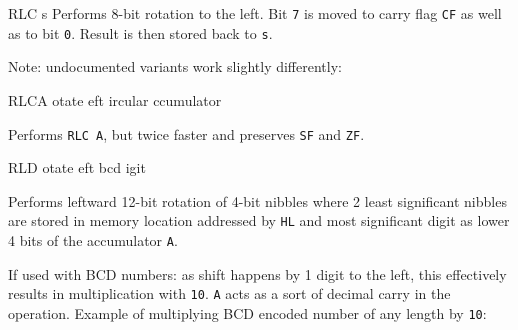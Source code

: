 \documentclass[12pt,twoside,openright,a4paper]{book}
\begin{document}
\begin{basedescript}{
	\desclabelstyle{\multilinelabel}
	\desclabelwidth{3cm}}
\begin{DetailItem}{RLC s}
		Performs 8-bit rotation to the left. Bit {\tt 7} is moved to carry flag {\tt CF} as well as to bit {\tt 0}. Result is then stored back to {\tt s}.

		Note: undocumented variants work slightly differently:

		\begin{multicols}{2}

		\end{multicols}

		\begin{DetailEffects}[p]
			\FlagsRLCr
		\end{DetailEffects}
						
		\begin{DetailTiming}
		\end{DetailTiming}

	\end{DetailItem}

	\pagebreak
	\begin{DetailItem}{RLCA}
		{otate eft ircular ccumulator}
		{\SymRLC{A}}
		
		Performs {\tt RLC A}, but twice faster and preserves {\tt SF} and {\tt ZF}.

		\begin{DetailEffects}
			\FlagsRLCA
		\end{DetailEffects}
						
		\begin{DetailTiming}
			\DetailTime{}{1}{4}
		\end{DetailTiming}

	\end{DetailItem}

	\label{DetailRefRLD}
	\begin{DetailItem}{RLD}
		{otate eft bcd igit}
		{\SymRLD}

		Performs leftward 12-bit rotation of 4-bit nibbles where 2 least significant nibbles are stored in memory location addressed by {\tt HL} and most significant digit as lower 4 bits of the accumulator {\tt A}.
		
		If used with BCD numbers: as shift happens by 1 digit to the left, this effectively results in multiplication with {\tt 10}. {\tt A} acts as a sort of decimal carry in the operation. Example of multiplying BCD encoded number of any length by {\tt 10}:


\end{DetailItem}
\end{basedescript}
\end{document}
